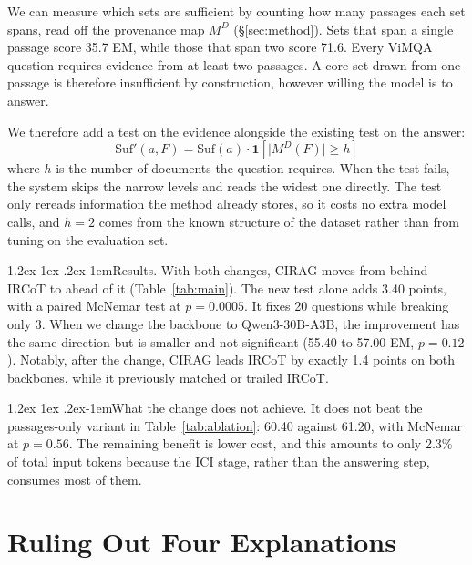 \documentclass[11pt]{article}
\makeatletter
\renewcommand\paragraph{\@startsection{paragraph}{4}{\z@}%
  {1.2ex \@plus1ex \@minus.2ex}{-1em}{\normalfont\normalsize\bfseries}}
\makeatother
\begin{document}
We can measure which sets are sufficient by counting how many passages each set spans, read off the provenance map $M^D$ (\S\ref{sec:method}). Sets that span a single passage score
35.7 EM, while those that span two score 71.6. Every ViMQA question requires evidence from at
least two passages. A core set drawn from one passage is therefore insufficient by
construction, however willing the model is to answer.

We therefore add a test on the evidence alongside the existing test on the answer:
\begin{equation}
\label{eq:newsuf}
\mathrm{Suf}'(a, F) = \mathrm{Suf}(a) \cdot \mathbf{1}\!\left[\lvert M^D(F) \rvert \ge h\right]
\end{equation}
where $h$ is the number of documents the question requires. When the test fails, the system
skips the narrow levels and reads the widest one directly. The test only rereads information
the method already stores, so it costs no extra model calls, and $h = 2$ comes from the known
structure of the dataset rather than from tuning on the evaluation set.

\paragraph{Results.} With both changes, CIRAG moves from behind IRCoT to ahead of it
(Table~\ref{tab:main}). The new test alone adds 3.40 points, with a paired McNemar test at
$p = 0.0005$. It fixes 20 questions while breaking only 3. When we change the backbone to
Qwen3-30B-A3B, the improvement has the same direction but is smaller and not significant
(55.40 to 57.00 EM, $p = 0.12$). Notably, after the change, CIRAG leads IRCoT by exactly 1.4
points on both backbones, while it previously matched or trailed IRCoT.

\paragraph{What the change does not achieve.} It does not beat the passages-only variant in
Table~\ref{tab:ablation}: 60.40 against 61.20, with McNemar at $p = 0.56$. The remaining
benefit is lower cost, and this amounts to only 2.3\% of total input tokens because the ICI
stage, rather than the answering step, consumes most of them.

\section{Ruling Out Four Explanations}
\label{sec:ruleout}
\end{document}

